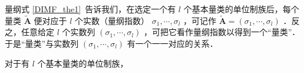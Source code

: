
量纲式
\autoref{DIMF_the1}~告诉我们，在选定一个有 $l$ 个基本量类的单位制族后，每个量类 $\tilde{\boldsymbol{A}}$ 便对应于 $l$ 个实数（量纲指数） $\sigma_1,\cdots,\sigma_l$ ，可记作 $\tilde{\boldsymbol{A}}=(\sigma_1,\cdots,\sigma_l)$ ．反之，任意给定 $l$ 个实数列 $(\sigma_1,\cdots,\sigma_l)$ ，可把它看作量纲指数以得到一个“量类”．于是“量类”与实数列 $(\sigma_1,\cdots,\sigma_l)$ 有一个一一对应的关系．
\begin{definition}{}
对于有 $l$ 个基本量类的单位制族，
\end{definition}